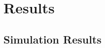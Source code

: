 \documentclass[a4paper,11pt]{article}
\begin{document}
\section{Results}


\subsection{Simulation Results}

\end{document}
